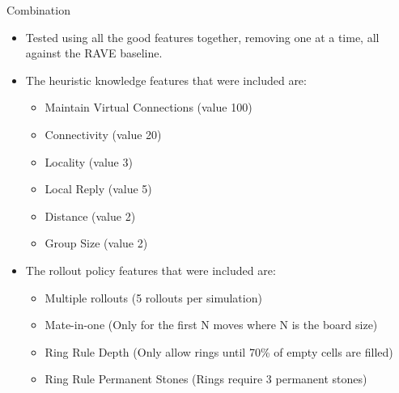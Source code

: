 \documentclass{beamer} %
\begin{document}
\begin{frame}{Combination}
\begin{itemize}
\item Tested using all the good features together, removing one at a time, all against the RAVE baseline.

\item The heuristic knowledge features that were included are:
\begin{itemize}
\item Maintain Virtual Connections (value 100)
\item Connectivity (value 20)
\item Locality (value 3)
\item Local Reply (value 5)
\item Distance (value 2)
\item Group Size (value 2)
\end{itemize}

\item The rollout policy features that were included are:
\begin{itemize}
\item Multiple rollouts (5 rollouts per simulation)
\item Mate-in-one (Only for the first N moves where N is the board size)
\item Ring Rule Depth (Only allow rings until 70\% of empty cells are filled)
\item Ring Rule Permanent Stones (Rings require 3 permanent stones)
\end{itemize}
\end{itemize}
\end{frame}
\end{document}
